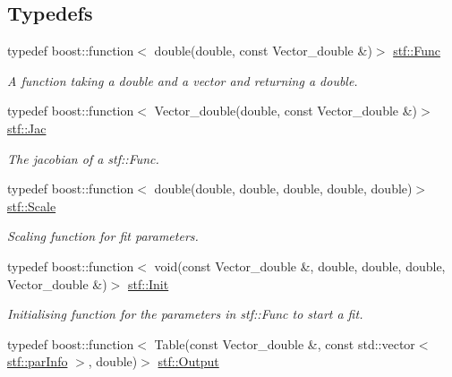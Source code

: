 \subsection*{Typedefs}
\begin{DoxyCompactItemize}
\item 
typedef boost::function$<$ double(double, const Vector\_\-double \&)$>$ \hyperlink{group__stfgen_ga11d6ec55abceacf5fdd47f9fc889d9a3}{stf::Func}
\begin{DoxyCompactList}\small\item\em A function taking a double and a vector and returning a double. \item\end{DoxyCompactList}\item 
\hypertarget{group__stfgen_ga77f3e621f1771784f2befaeb3d1ac4fb}{
typedef boost::function$<$ Vector\_\-double(double, const Vector\_\-double \&)$>$ \hyperlink{group__stfgen_ga77f3e621f1771784f2befaeb3d1ac4fb}{stf::Jac}}
\label{group__stfgen_ga77f3e621f1771784f2befaeb3d1ac4fb}

\begin{DoxyCompactList}\small\item\em The jacobian of a stf::Func. \item\end{DoxyCompactList}\item 
\hypertarget{group__stfgen_ga775530afebda38e8138e8eb1401a0e01}{
typedef boost::function$<$ double(double, double, double, double, double)$>$ \hyperlink{group__stfgen_ga775530afebda38e8138e8eb1401a0e01}{stf::Scale}}
\label{group__stfgen_ga775530afebda38e8138e8eb1401a0e01}

\begin{DoxyCompactList}\small\item\em Scaling function for fit parameters. \item\end{DoxyCompactList}\item 
\hypertarget{group__stfgen_ga15ccefdb3c4b758564e73f080639ff98}{
typedef boost::function$<$ void(const Vector\_\-double \&, double, double, double, Vector\_\-double \&)$>$ \hyperlink{group__stfgen_ga15ccefdb3c4b758564e73f080639ff98}{stf::Init}}
\label{group__stfgen_ga15ccefdb3c4b758564e73f080639ff98}

\begin{DoxyCompactList}\small\item\em Initialising function for the parameters in stf::Func to start a fit. \item\end{DoxyCompactList}\item 
\hypertarget{group__stfgen_ga66542f63882a99158a17cdc977eac5e8}{
typedef boost::function$<$ Table(const Vector\_\-double \&, const std::vector$<$ \hyperlink{structstf_1_1parInfo}{stf::parInfo} $>$, double)$>$ \hyperlink{group__stfgen_ga66542f63882a99158a17cdc977eac5e8}{stf::Output}}
\label{group__stfgen_ga66542f63882a99158a17cdc977eac5e8}


\end{DoxyCompactItemize}
